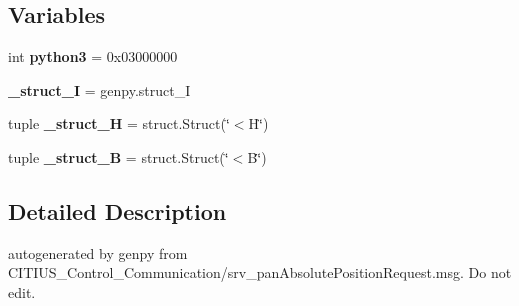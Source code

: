 \subsection*{\-Variables}
\begin{DoxyCompactItemize}
\item 
\hypertarget{namespace_c_i_t_i_u_s___control___communication_1_1srv_1_1__srv__pan_absolute_position_ac649969ac0608b49bb0ac95330409410}{int {\bfseries python3} = 0x03000000}\label{namespace_c_i_t_i_u_s___control___communication_1_1srv_1_1__srv__pan_absolute_position_ac649969ac0608b49bb0ac95330409410}

\item 
\hypertarget{namespace_c_i_t_i_u_s___control___communication_1_1srv_1_1__srv__pan_absolute_position_ac7e1dc03fd891ea2e2c6251bf77e6e10}{{\bfseries \-\_\-struct\-\_\-\-I} = genpy.\-struct\-\_\-\-I}\label{namespace_c_i_t_i_u_s___control___communication_1_1srv_1_1__srv__pan_absolute_position_ac7e1dc03fd891ea2e2c6251bf77e6e10}

\item 
\hypertarget{namespace_c_i_t_i_u_s___control___communication_1_1srv_1_1__srv__pan_absolute_position_a98920665dbde4fdd5a97d2a39575518c}{tuple {\bfseries \-\_\-struct\-\_\-\-H} = struct.\-Struct(\char`\"{}$<$\-H\char`\"{})}\label{namespace_c_i_t_i_u_s___control___communication_1_1srv_1_1__srv__pan_absolute_position_a98920665dbde4fdd5a97d2a39575518c}

\item 
\hypertarget{namespace_c_i_t_i_u_s___control___communication_1_1srv_1_1__srv__pan_absolute_position_a56d1b9d29c615e1493805272fad2b650}{tuple {\bfseries \-\_\-struct\-\_\-\-B} = struct.\-Struct(\char`\"{}$<$\-B\char`\"{})}\label{namespace_c_i_t_i_u_s___control___communication_1_1srv_1_1__srv__pan_absolute_position_a56d1b9d29c615e1493805272fad2b650}

\end{DoxyCompactItemize}


\subsection{\-Detailed \-Description}
\begin{DoxyVerb}autogenerated by genpy from CITIUS_Control_Communication/srv_panAbsolutePositionRequest.msg. Do not edit.\end{DoxyVerb}
 